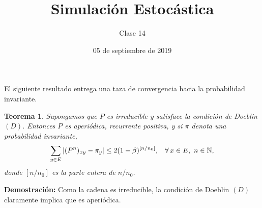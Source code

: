 \documentclass[a4paper]{article}
\title{Simulación Estocástica}
\author{Clase 14}
\date{05 de septiembre de 2019}
\newtheorem{teorema}{Teorema}
\numberwithin{equation}{subsection}
\numberwithin{definicion}{subsection}
\def\N{\mathbb N}
\begin{document}
\maketitle

El siguiente resultado entrega una taza de convergencia hacia la probabilidad invariante.

\begin{teorema}
Supongamos que $P$ es irreducible y satisface la condición de Doeblin $(D)$. Entonces $P$ es aperiódica, recurrente positiva, y si $\pi$ denota una probabilidad invariante, 
\[\sum_{y\in E}|(P^n)_{xy}-\pi_y| \leq 2(1-\beta)^{[n/n_0]},\hspace{0.3cm}\forall\,x\in E,\,\,n\in \N,\]
donde $[n/n_0]$ es la parte entera de $n/n_0$.
\end{teorema}

\textbf{Demostración: }Como la cadena es irreducible, la condición de Doeblin $(D)$ claramente implica que es aperiódica.
\end{document}
